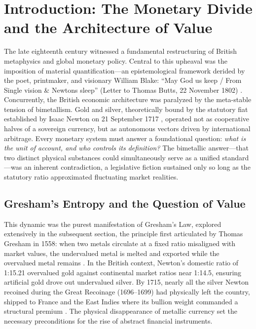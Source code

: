 \documentclass[
]{article}
\begin{document}
\newpage

\section{Introduction: The Monetary Divide and the Architecture of
Value}\label{introduction-the-monetary-divide-and-the-architecture-of-value}

The late eighteenth century witnessed a fundamental restructuring of
British metaphysics and global monetary policy. Central to this upheaval
was the imposition of material quantification---an epistemological
framework derided by the poet, printmaker, and visionary William Blake:
``May God us keep / From Single vision \& Newtons sleep'' (Letter to
Thomas Butts, 22 November 1802) \citep{erdman1988complete}.
Concurrently, the British economic architecture was paralyzed by the
meta-stable tension of bimetallism. Gold and silver, theoretically bound
by the statutory fiat established by Isaac Newton on 21 September 1717
\citep{horsefield1960british}, operated not as cooperative halves of a
sovereign currency, but as autonomous vectors driven by international
arbitrage. Every monetary system must answer a foundational question:
\emph{what is the unit of account, and who controls its definition?} The
bimetallic answer---that two distinct physical substances could
simultaneously serve as a unified standard---was an inherent
contradiction, a legislative fiction sustained only so long as the
statutory ratio approximated fluctuating market realities.

\subsection{Gresham's Entropy and the Question of
Value}\label{greshams-entropy-and-the-question-of-value}

This dynamic was the purest manifestation of Gresham's Law, explored
extensively in the subsequent section, the principle first articulated
by Thomas Gresham in 1558: when two metals circulate at a fixed ratio
misaligned with market values, the undervalued metal is melted and
exported while the overvalued metal remains \citep{thornton1802nature}.
In the British context, Newton's domestic ratio of 1:15.21 overvalued
gold against continental market ratios near 1:14.5, ensuring artificial
gold drove out undervalued silver. By 1715, nearly all the silver Newton
recoined during the Great Recoinage (1696--1699) had physically left the
country, shipped to France and the East Indies where its bullion weight
commanded a structural premium
\citep{quinn1996competing, quinn2006bank}. The physical disappearance of
metallic currency set the necessary preconditions for the rise of
abstract financial instruments.
\end{document}
